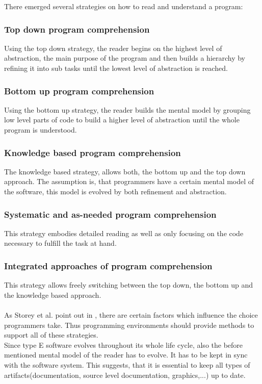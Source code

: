 There emerged several strategies on how to read and understand a program\cite{Storey:1999:CDE:308936.308940}\cite{Storey:1997:PUT:832304.836998}:
\subsubsection*{Top down program comprehension}
Using the top down strategy, the reader begins on the highest level of abstraction, the main purpose of the program and then builds a hierarchy by refining it into sub tasks until the lowest level of abstraction is reached.
\subsubsection*{Bottom up program comprehension} Using the bottom up strategy, the reader builds the mental model by grouping low level parts of code to build a higher level of abstraction until the whole program is understood.
\subsubsection*{Knowledge based program comprehension} The knowledge based strategy, allows both, the bottom up and the top down approach. The assumption is, that programmers have a certain mental model of the software, this model is evolved by both refinement and abstraction.
\subsubsection*{Systematic and as-needed program comprehension} This strategy embodies detailed reading as well as only focusing on the code necessary to fulfill the task at hand.
\subsubsection*{Integrated approaches of program comprehension} This strategy allows freely switching between the top down, the bottom up and the knowledge based approach.
\\\\
As Storey et al. point out in \cite{Storey:1999:CDE:308936.308940}, there are certain factors which influence the choice programmers take. Thus programming environments should provide methods to support all of these strategies.
\\
Since type E software evolves throughout its whole life cycle, also the before mentioned mental model of the reader has to evolve. It has to be kept in sync with the software system. This suggests, that it is essential to keep all types of artifacts(documentation, source level documentation, graphics,...) up to date.

